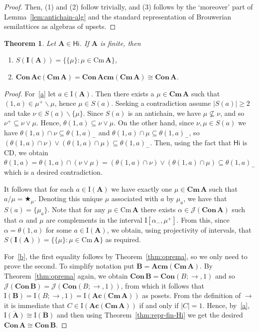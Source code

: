 \documentclass{amsart}
\newtheorem{theorem}{Theorem}[section]
\newcommand{\alg}[1]{\mathbf{#1}}
\newcommand{\var}[1]{\mathsf{#1}}
\newcommand{\ov}[1]{\overline{#1}}
\newcommand{\Con}[1]{\mathbf{Con}\, #1}
\newcommand{\Cm}[1]{\mathbf{Cm}\, #1}
\newcommand{\cm}[1]{\mathrm{Cm}\, #1}
\newcommand{\J}[1]{\mathcal{J}(#1)}
\newcommand{\Irr}[1]{\mathbf{I}(#1)}
\newcommand{\irr}[1]{\mathrm{I}(#1)}
\def\ra{\rightarrow}
\def\op{\bigstar}
\begin{document}
\begin{proof}
Then, (1) and (2) follow trivially, and (3) follows by the `moreover' part of
Lemma~\ref{lem:antichain-alg} and the standard representation of
Brouwerian semilattices as algebras of upsets.
\end{proof}  

\begin{theorem}\label{thm:repres} 
Let $\alg{A}\in\var{Hi}$. If $\alg{A}$ is finite, then
\begin{enumerate}
\item $S(\Irr{\alg{A}}) = \{\{\mu\}: \mu\in\cm{\alg{A}}\}$,\label{a}
\item $\Con{\mathbf{Ac}(\Cm{\alg{A}})} = \Con{\mathbf{Acm}(\Cm{\alg{A}})} 
  \cong\Con{\alg{A}}$.\label{b}
\end{enumerate}    
\end{theorem}

\begin{proof}
For~\eqref{a} let $a\in \irr{\alg{A}}$. Then there exists a $\mu\in\Cm{\alg{A}}$
such that $(1,a)\in \mu^+\smallsetminus\mu$, hence $\mu\in S(a)$. Seeking a
contradiction assume $|S(a)|\geq 2$ and take $\nu\in S(a)\smallsetminus\{\mu\}$. 
Since $S(a)$ is an antichain, we have $\mu\not\subseteq\nu$, and so
$\nu^+\subseteq \nu\vee\mu$. Hence, $\theta(1,a)\subseteq \nu\vee\mu$.
On the other hand, since $\nu,\mu\in S(a)$ we have
$\theta(1,a)\cap\nu\subseteq \theta(1,a)_-$ and 
$\theta(1,a)\cap\mu\subseteq \theta(1,a)_-$, so
$(\theta(1,a)\cap\nu)\vee(\theta(1,a)\cap\mu)\subseteq \theta(1,a)_-$.
Then, using the fact that $\var{Hi}$ is CD, we obtain
$\theta(1,a) = \theta(1,a)\cap(\nu\vee\mu) =
(\theta(1,a)\cap\nu)\vee(\theta(1,a)\cap\mu) \subseteq \theta(1,a)_-$ which is a
desired contradiction.  


It follows that for each $a\in \irr{\alg{A}}$ we have exactly one
$\mu\in\Cm{\alg{A}}$ such that $a/\mu = \op_\mu$. Denoting this unique $\mu$
associated with $a$ by $\mu_a$, we have that $S(a) = \{\mu_a\}$.
Note that for any $\mu\in\cm{\alg{A}}$ there exists $\alpha\in
\J{\Con{\alg{A}}}$ such that $\alpha$ and $\mu$ are complements in the interval
$\mathrm{I}[\alpha_-, \mu^+]$. From this, since $\alpha = \theta(1,a)$ for some $a\in
\irr{\alg{A}}$, we obtain, using projectivity of intervals, that
$S(\Irr{\alg{A}}) = \{\{\mu\}: \mu\in\cm{\alg{A}}\}$ as required.

For~\eqref{b}, the first equality follows by Theorem~\ref{thm:oprema}, so
we only need to prove the second. To simplify notation put
$\alg{B} = \mathbf{Acm}(\Cm{\alg{A}})$.
By Theorem~\ref{thm:oprema} again, we obtain 
$\Con{\alg{B}} = \mathbf{Con}(B;\ra,1)$
and so $\J{\Con{\alg{B}}} = \J{\mathbf{Con}(B;\ra,1)}$,
from which it follows that
$\irr{\alg{B}} = \mathrm{I}(B;\ra,1) = 
\irr{\mathbf{Ac}(\Cm{\alg{A}})}$
as posets. From the definition of $\ra$ it is immediate that
$C\in \irr{\mathbf{Ac}(\Cm{\alg{A}})}$ if and only if $|C| = 1$.
Hence, by~\eqref{a},  
$\ov{\irr{\alg{A}}} \cong \ov{\irr{\alg{B}}}$
and then using Theorem~\ref{thm:repr-fin-Hi} we get the desired 
$\Con{\alg{A}}\cong\Con{\alg{B}}$.
\end{proof}  
\end{document}
